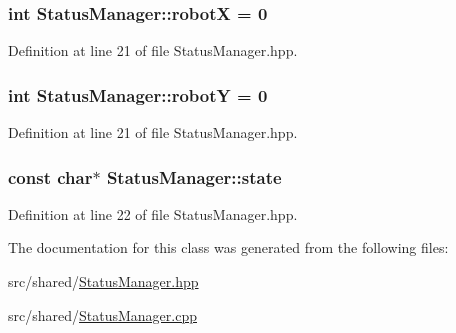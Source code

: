 \hypertarget{classStatusManager_a844d999c234bdcfcb0f465bdf2da9b72}{
\subsubsection[{robot\-X}]{\setlength{\rightskip}{0pt plus 5cm}int Status\-Manager\-::robot\-X = 0\hspace{0.3cm}{\ttfamily [static]}}}\label{classStatusManager_a844d999c234bdcfcb0f465bdf2da9b72}


Definition at line 21 of file Status\-Manager.\-hpp.

\hypertarget{classStatusManager_a2e09a9dcfcc6c38cae621c04f49c58b4}{
\subsubsection[{robot\-Y}]{\setlength{\rightskip}{0pt plus 5cm}int Status\-Manager\-::robot\-Y = 0\hspace{0.3cm}{\ttfamily [static]}}}\label{classStatusManager_a2e09a9dcfcc6c38cae621c04f49c58b4}


Definition at line 21 of file Status\-Manager.\-hpp.

\hypertarget{classStatusManager_a6f3c0467116c3bfbf9d7507cb04b7d5a}{
\subsubsection[{state}]{\setlength{\rightskip}{0pt plus 5cm}const char$\ast$ Status\-Manager\-::state\hspace{0.3cm}{\ttfamily [static]}}}\label{classStatusManager_a6f3c0467116c3bfbf9d7507cb04b7d5a}


Definition at line 22 of file Status\-Manager.\-hpp.



The documentation for this class was generated from the following files\-:\begin{DoxyCompactItemize}
\item 
src/shared/\hyperlink{StatusManager_8hpp}{Status\-Manager.\-hpp}\item 
src/shared/\hyperlink{StatusManager_8cpp}{Status\-Manager.\-cpp}\end{DoxyCompactItemize}
